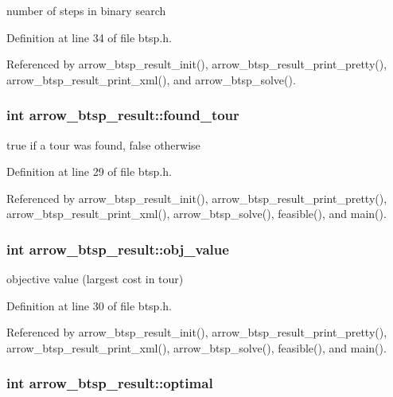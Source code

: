 number of steps in binary search 

Definition at line 34 of file btsp.h.

Referenced by arrow\_\-btsp\_\-result\_\-init(), arrow\_\-btsp\_\-result\_\-print\_\-pretty(), arrow\_\-btsp\_\-result\_\-print\_\-xml(), and arrow\_\-btsp\_\-solve().\hypertarget{structarrow__btsp__result_6ba21b4231cfe2c1e437a9f7e8f31aa6}{
\subsubsection[{found\_\-tour}]{\setlength{\rightskip}{0pt plus 5cm}int {\bf arrow\_\-btsp\_\-result::found\_\-tour}}}
\label{structarrow__btsp__result_6ba21b4231cfe2c1e437a9f7e8f31aa6}


true if a tour was found, false otherwise 

Definition at line 29 of file btsp.h.

Referenced by arrow\_\-btsp\_\-result\_\-init(), arrow\_\-btsp\_\-result\_\-print\_\-pretty(), arrow\_\-btsp\_\-result\_\-print\_\-xml(), arrow\_\-btsp\_\-solve(), feasible(), and main().\hypertarget{structarrow__btsp__result_ea5f7f45bf61f33ca6b57829da92e041}{
\subsubsection[{obj\_\-value}]{\setlength{\rightskip}{0pt plus 5cm}int {\bf arrow\_\-btsp\_\-result::obj\_\-value}}}
\label{structarrow__btsp__result_ea5f7f45bf61f33ca6b57829da92e041}


objective value (largest cost in tour) 

Definition at line 30 of file btsp.h.

Referenced by arrow\_\-btsp\_\-result\_\-init(), arrow\_\-btsp\_\-result\_\-print\_\-pretty(), arrow\_\-btsp\_\-result\_\-print\_\-xml(), arrow\_\-btsp\_\-solve(), feasible(), and main().\hypertarget{structarrow__btsp__result_febcf61e24bf277eeb7795c18bd42b8b}{
\subsubsection[{optimal}]{\setlength{\rightskip}{0pt plus 5cm}int {\bf arrow\_\-btsp\_\-result::optimal}}}
\label{structarrow__btsp__result_febcf61e24bf277eeb7795c18bd42b8b}


